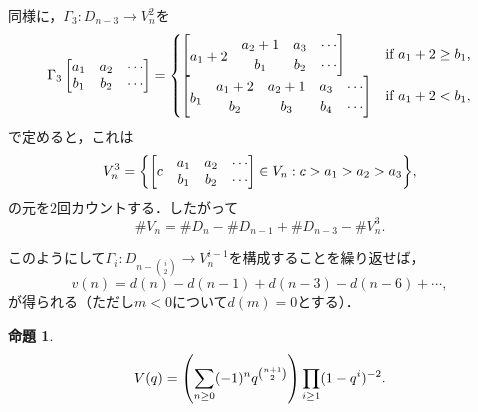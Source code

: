 \documentclass[xelatex,ja=standard,a4paper,14pt,everyparhook=compat]{bxjsarticle}
\newcommand{\up}[1]{\smash{\raisebox{.5\normalbaselineskip}{$#1$}}}
\theoremstyle{definition}
\newtheorem{proposition}[theorem]{命題}
\begin{document}
同様に，$\Gamma_3 : D_{n-3} \to V_n^2$を \begin{equation*}
    \Gamma_3 \begin{bmatrix}
        a_1 & a_2 & \cdots \\
        b_1 & b_2 & \cdots
    \end{bmatrix} = \begin{cases}
        \begin{bmatrix}
                         & a_2 + 1 & a_3 & \cdots \\
            \up{a_1 + 2} & b_1     & b_2 & \cdots
        \end{bmatrix} & \text{if $a_1 + 2 \geq b_1$,} \\
        \begin{bmatrix}
                     & a_1 + 2 & a_2 + 1 & a_3 & \cdots \\
            \up{b_1} & b_2     & b_3     & b_4 & \cdots
        \end{bmatrix} & \text{if $a_1 + 2 < b_1$,} \\
    \end{cases}
\end{equation*}
で定めると，これは \begin{equation*}
    V_n^3 = \mleft\{ \begin{bmatrix}
               & a_1 & a_2 & \cdots \\
        \up{c} & b_1 & b_2 & \cdots
    \end{bmatrix} \in V_n : c > a_1 > a_2 > a_3 \mright\},
\end{equation*}
の元を$2$回カウントする．したがって \begin{equation*}
    \#V_n = \#D_n - \#D_{n-1} + \#D_{n-3} - \#V_n^3.
\end{equation*}

このようにして$\Gamma_i : D_{n-\binom{i}{2}} \to V_n^{i-1}$を構成することを繰り返せば， \begin{equation*}
    v(n) = d(n) - d(n-1) + d(n-3) - d(n-6) + \cdots,
\end{equation*}
が得られる（ただし$m < 0$について$d(m) = 0$とする）．

\newpage

\begin{proposition}
    \begin{equation*}
        V(q) = \mleft( \sum_{n \geq 0} (-1)^n q^{\binom{n+1}{2}} \mright) \prod_{i \geq 1} (1-q^i)^{-2}.
    \end{equation*}
\end{proposition}
\end{document}
